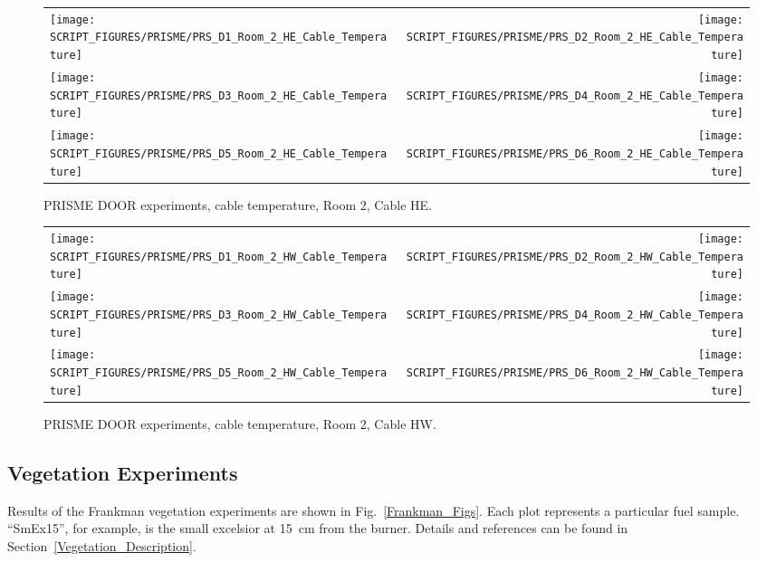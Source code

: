 \begin{figure}[p]
\begin{tabular*}{\textwidth}{l@{\extracolsep{\fill}}r}
\texttt{[image: SCRIPT\_FIGURES/PRISME/PRS\_D1\_Room\_2\_HE\_Cable\_Temperature]} &
\texttt{[image: SCRIPT\_FIGURES/PRISME/PRS\_D2\_Room\_2\_HE\_Cable\_Temperature]} \\
\texttt{[image: SCRIPT\_FIGURES/PRISME/PRS\_D3\_Room\_2\_HE\_Cable\_Temperature]} &
\texttt{[image: SCRIPT\_FIGURES/PRISME/PRS\_D4\_Room\_2\_HE\_Cable\_Temperature]} \\
\texttt{[image: SCRIPT\_FIGURES/PRISME/PRS\_D5\_Room\_2\_HE\_Cable\_Temperature]} &
\texttt{[image: SCRIPT\_FIGURES/PRISME/PRS\_D6\_Room\_2\_HE\_Cable\_Temperature]}
\end{tabular*}
\caption{PRISME DOOR experiments, cable temperature, Room 2, Cable HE.}
\label{PRISME_HE_Cable_Room_2}
\end{figure}

\begin{figure}[p]
\begin{tabular*}{\textwidth}{l@{\extracolsep{\fill}}r}
\texttt{[image: SCRIPT\_FIGURES/PRISME/PRS\_D1\_Room\_2\_HW\_Cable\_Temperature]} &
\texttt{[image: SCRIPT\_FIGURES/PRISME/PRS\_D2\_Room\_2\_HW\_Cable\_Temperature]} \\
\texttt{[image: SCRIPT\_FIGURES/PRISME/PRS\_D3\_Room\_2\_HW\_Cable\_Temperature]} &
\texttt{[image: SCRIPT\_FIGURES/PRISME/PRS\_D4\_Room\_2\_HW\_Cable\_Temperature]} \\
\texttt{[image: SCRIPT\_FIGURES/PRISME/PRS\_D5\_Room\_2\_HW\_Cable\_Temperature]} &
\texttt{[image: SCRIPT\_FIGURES/PRISME/PRS\_D6\_Room\_2\_HW\_Cable\_Temperature]}
\end{tabular*}
\caption{PRISME DOOR experiments, cable temperature, Room 2, Cable HW.}
\label{PRISME_HW_Cable_Room_2}
\end{figure}


\clearpage

\subsection{Vegetation Experiments}

Results of the Frankman vegetation experiments are shown in Fig.~\ref{Frankman_Figs}. Each plot represents a particular fuel sample. ``SmEx15'', for example, is the small excelsior at 15~cm from the burner. Details and references can be found in Section~\ref{Vegetation_Description}.

